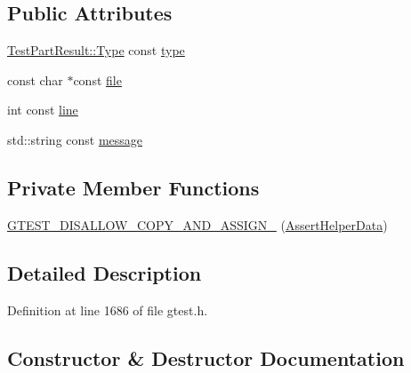 \subsection*{Public Attributes}
\begin{DoxyCompactItemize}
\item 
\hyperlink{classtesting_1_1TestPartResult_a65ae656b33fdfdfffaf34858778a52d5}{Test\+Part\+Result\+::\+Type} const \hyperlink{structtesting_1_1internal_1_1AssertHelper_1_1AssertHelperData_a7b1d1a77882cd82107acea856d45692f}{type}
\item 
const char $\ast$const \hyperlink{structtesting_1_1internal_1_1AssertHelper_1_1AssertHelperData_a639ae4acc706e919b101786f71e9dc15}{file}
\item 
int const \hyperlink{structtesting_1_1internal_1_1AssertHelper_1_1AssertHelperData_aff816673320ecd035288dffe44760f90}{line}
\item 
std\+::string const \hyperlink{structtesting_1_1internal_1_1AssertHelper_1_1AssertHelperData_ae81536d57b8deb5dca4159cc6f7efdf0}{message}
\end{DoxyCompactItemize}
\subsection*{Private Member Functions}
\begin{DoxyCompactItemize}
\item 
\hyperlink{structtesting_1_1internal_1_1AssertHelper_1_1AssertHelperData_a5cfdd2fca371e33566ffdb2357606df2}{G\+T\+E\+S\+T\+\_\+\+D\+I\+S\+A\+L\+L\+O\+W\+\_\+\+C\+O\+P\+Y\+\_\+\+A\+N\+D\+\_\+\+A\+S\+S\+I\+G\+N\+\_\+} (\hyperlink{structtesting_1_1internal_1_1AssertHelper_1_1AssertHelperData}{Assert\+Helper\+Data})
\end{DoxyCompactItemize}


\subsection{Detailed Description}


Definition at line 1686 of file gtest.\+h.



\subsection{Constructor \& Destructor Documentation}
\mbox{\label{structtesting_1_1internal_1_1AssertHelper_1_1AssertHelperData_ad2356f3f1e56d1a63562efe0f8b3f1bb}} 

